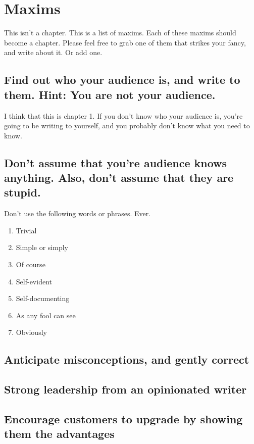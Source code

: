 \chapter{Maxims}

This isn't a chapter. This is a list of maxims. Each of these maxims
should become a chapter. Please feel free to grab one of them that
strikes your fancy, and write about it. Or add one.

\section{Find out who your audience is, and write to them. Hint: You are
not your audience.}

I think that this is chapter 1. If you don't know who your audience is,
you're going to be writing to yourself, and you probably don't know what
you need to know.

\section{Don't assume that you're audience knows anything. Also, don't assume
that they are stupid.}

Don't use the following words or phrases. Ever.
\begin{enumerate}
\item Trivial
\item Simple or simply
\item Of course
\item Self-evident
\item Self-documenting
\item As any fool can see
\item Obviously
\end{enumerate}

\section{Anticipate misconceptions, and gently correct}

\section{Strong leadership from an opinionated writer}

\section{Encourage customers to upgrade by showing them the advantages}

